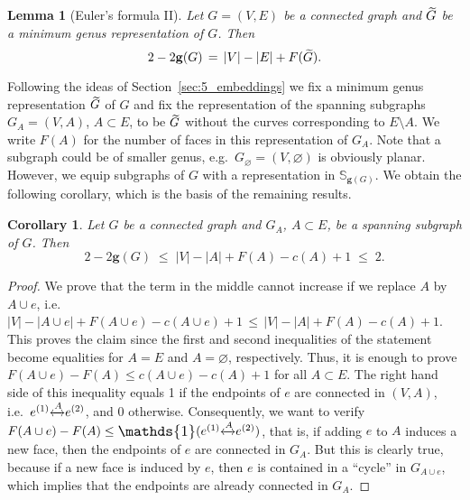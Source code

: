 \documentclass{dis}
\newtheorem{corollary}[theorem]{Corollary}
\newtheorem{lemma}[theorem]{Lemma}
\theoremstyle{citing}
\begin{document}
\begin{lemma}[Euler's formula II]\label{lemma:euler2}
Let $G=(V,E)$ be a connected graph and ${\,\raisebox{2pt}{ ${\widetilde{{}}}$ }\mkern-15mu G}$ be a 
minimum genus 
representation of $G$. Then
\[
2 - 2{\ensuremath{\mathbf{g}}}(G) \,=\, {\left\vert {V} \right\vert} - {\left\vert {E} \right\vert} + F({\,\raisebox{2pt}{ ${\widetilde{{}}}$ }\mkern-15mu G}).
\]
\end{lemma}
\vspace{1mm}

Following the ideas of Section~\ref{sec:5_embeddings} 
we fix a minimum genus representation ${\,\raisebox{2pt}{ ${\widetilde{{}}}$ }\mkern-15mu G}$ of $G$ and 
fix the representation of the spanning subgraphs 
$G_A=(V,A)$, $A\subset E$, to be ${\,\raisebox{2pt}{ ${\widetilde{{}}}$ }\mkern-15mu G}$ without the 
curves corresponding to $E\setminus A$. 
We write $F(A)$ for the number of faces in this 
representation of $G_A$.
Note that a subgraph could be of smaller genus, 
e.g.~$G_\varnothing=(V,\varnothing)$ is obviously planar. 
However, we equip subgraphs of $G$ with a representation 
in ${\ensuremath{\mathbb{S}}}_{{\ensuremath{\mathbf{g}}}(G)}$. 
We obtain the following corollary, which is the basis 
of the remaining results.

\begin{corollary}\label{coro:euler2}
Let $G$ be a connected graph and 
$G_A$, $A\subset E$, be a spanning 
subgraph of $G$. Then
\[
2-2{\ensuremath{\mathbf{g}}}(G) 
\;\le\; {\left\vert {V} \right\vert} - {\left\vert {A} \right\vert} + F(A) - c(A) + 1 
\;\le\; 2.
\]
\end{corollary}
\vspace{1mm}

\begin{proof} 
We prove that the term in the middle cannot increase if we replace 
$A$ by $A\cup e$, i.e.
${\left\vert {V} \right\vert} - {\left\vert {A\cup e} \right\vert} + F(A\cup e) - c(A\cup e) + 1
\,\le\, {\left\vert {V} \right\vert} - {\left\vert {A} \right\vert} + F(A) - c(A) + 1$.
This proves the claim since 
the first and second inequalities of the statement become  
equalities for $A=E$ and $A=\varnothing$, respectively. 
Thus, it is enough to prove 
$F(A\cup e)-F(A)\le c(A\cup e)-c(A)+1$ for all $A\subset E$. 
The right hand side of this inequality equals 1 if 
the endpoints of $e$ are connected in $(V,A)$, 
i.e.~$e^{(1)}{\xleftrightarrow{{A}}}e^{(2)}$, and 0 otherwise. 
Consequently, we want to verify 
$F(A\cup e)-F(A)\le {\scalebox{1.2}{\raisebox{-0.2mm}{$\mathds{1}$}}}(e^{(1)}{\xleftrightarrow{{A}}}e^{(2)})$, that is, 
if adding $e$ to $A$ induces a new face, then 
the endpoints of $e$ are connected in $G_A$.
But this is clearly true, because if a new face is induced by 
$e$, then $e$ is contained in a ``cycle'' in $G_{A\cup e}$, 
which implies that the endpoints are already connected in $G_A$.
\end{proof}
\end{document}
